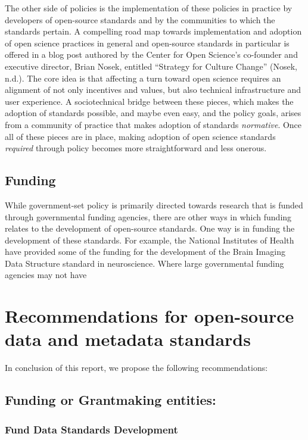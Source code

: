 \documentclass[
  letterpaper,
  DIV=11,
  numbers=noendperiod]{scrartcl}
\begin{document}
The other side of policies is the implementation of these policies in
practice by developers of open-source standards and by the communities
to which the standards pertain. A compelling road map towards
implementation and adoption of open science practices in general and
open-source standards in particular is offered in a blog post authored
by the Center for Open Science's co-founder and executive director,
Brian Nosek, entitled ``Strategy for Culture Change'' (Nosek, n.d.). The
core idea is that affecting a turn toward open science requires an
alignment of not only incentives and values, but also technical
infrastructure and user experience. A sociotechnical bridge between
these pieces, which makes the adoption of standards possible, and maybe
even easy, and the policy goals, arises from a community of practice
that makes adoption of standards \emph{normative}. Once all of these
pieces are in place, making adoption of open science standards
\emph{required} through policy becomes more straightforward and less
onerous.

\subsection{Funding}\label{funding}

While government-set policy is primarily directed towards research that
is funded through governmental funding agencies, there are other ways in
which funding relates to the development of open-source standards. One
way is in funding the development of these standards. For example, the
National Institutes of Health have provided some of the funding for the
development of the Brain Imaging Data Structure standard in
neuroscience. Where large governmental funding agencies may not have

\section{Recommendations for open-source data and metadata
standards}\label{recommendations-for-open-source-data-and-metadata-standards}

In conclusion of this report, we propose the following recommendations:

\subsection{Funding or Grantmaking
entities:}\label{funding-or-grantmaking-entities}

\subsubsection{Fund Data Standards
Development}\label{fund-data-standards-development}
\end{document}
